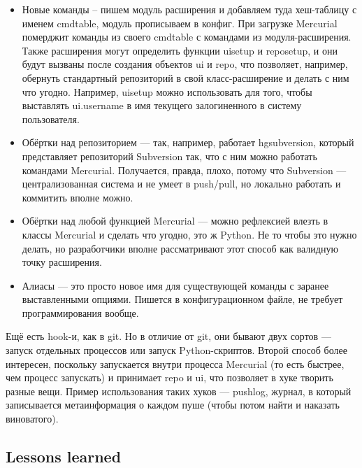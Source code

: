 \documentclass[a5paper]{article}
\begin{document}
\begin{itemize}
	\item Новые команды -- пишем модуль расширения и добавляем туда хеш-таблицу с именем cmdtable, модуль прописываем в конфиг. При загрузке Mercurial померджит команды из своего cmdtable с командами из модуля-расширения. Также расширения могут определить функции uisetup и reposetup, и они будут вызваны после создания объектов ui и repo, что позволяет, например, обернуть стандартный репозиторий в свой класс-расширение и делать с ним что угодно. Например, uisetup можно использовать для того, чтобы выставлять ui.username в имя текущего залогиненного в систему пользователя.
	\item Обёртки над репозиторием --- так, например, работает hgsubversion, который представляет репозиторий Subversion так, что с ним можно работать командами Mercurial. Получается, правда, плохо, потому что Subversion --- централизованная система и не умеет в push/pull, но локально работать и коммитить вполне можно.
	\item Обёртки над любой функцией Mercurial --- можно рефлексией влезть в классы Mercurial и сделать что угодно, это ж Python. Не то чтобы это нужно делать, но разработчики вполне рассматривают этот способ как валидную точку расширения.
	\item Алиасы --- это просто новое имя для существующей команды с заранее выставленными опциями. Пишется в конфигурационном файле, не требует программирования вообще.
\end{itemize}

Ещё есть hook-и, как в git. Но в отличие от git, они бывают двух сортов --- запуск отдельных процессов или запуск Python-скриптов. Второй способ более интересен, поскольку запускается внутри процесса Mercurial (то есть быстрее, чем процесс запускать) и принимает repo и ui, что позволяет в хуке творить разные вещи. Пример использования таких хуков --- pushlog, журнал, в который записывается метаинформация о каждом пуше (чтобы потом найти и наказать виноватого).

\subsection{Lessons learned}
\end{document}
